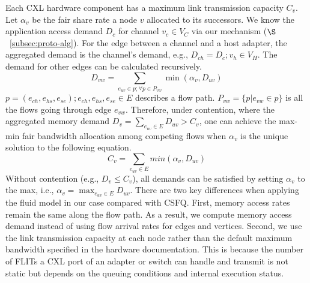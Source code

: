 Each CXL hardware component has a maximum link transmission capacity \(C_v\). 
Let \(\alpha_v\) be the fair share rate a node \(v\) allocated to its successors. We know the application access demand \(D_c\) for channel \(v_c \in V_C\) via our mechanism (\(\S\)~\ref{subsec:proto-alg}).
For the edge between a channel and a host adapter, the aggregated demand is the channel's demand, e.g., \(D_{ch}=D_c; v_h \in V_H \). The demand for other edges can be calculated recursively.
\begin{equation}
\label{eq:demand} 
D_{vw}= \sum_{e_{uv}\in p;  \forall p \in P_{vw}} \min(\alpha_v, D_{uv})
\end{equation}
\(p = (e_{ch}, e_{hs}, e_{se}); e_{ch}, e_{hs}, e_{se} \in E\) describes a flow path. \(P_{vw} = \{p|e_{vw} \in p\}\) is all the flows going through edge \(e_{vw}\). Therefore, under contention, where the aggregated memory demand \(D_v = \sum_{e_{uv} \in E} D_{uv} > C_v\), one can achieve the max-min fair bandwidth allocation among competing flows when \(\alpha_v\) is the unique solution to the following equation.
\begin{equation}
\label{eq:alpha-1}
C_v = \sum_{e_{uv}\in E} min(\alpha_v, D_{uv})
\end{equation}
Without contention (e.g., \(D_v \leq C_v\)), all demands can be satisfied by setting \(\alpha_v\) to the max, i.e., \(\alpha_v = \max_{e_{uv}\in E} D_{uv}\).
There are two key differences when applying the fluid model in our case compared with CSFQ. First, memory access rates remain the same along the flow path. As a result, we compute memory access demand instead of using flow arrival rates for edges and vertices. Second, we use the link transmission capacity at each node rather than the default maximum bandwidth specified in the hardware documentation. This is because the number of FLITs a CXL port of an adapter or switch can handle and transmit is not static but depends on the queuing conditions and internal execution status.


